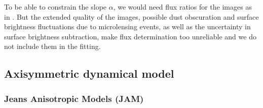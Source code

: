 \documentclass[useAMS,usenatbib]{mnras}
\begin{document}
To be able to constrain the slope $\alpha$, we would need flux ratios for the images as in \citet{GlennEC}. But the extended quality of the images, possible dust obscuration and surface brightness fluctuations due to microlensing events, as well as the uncertainty in surface brightness subtraction, make flux determination too unreliable and we do not include them in the fitting.

\subsection{Axisymmetric dynamical model} \label{sec:model_JAM}

\subsubsection{Jeans Anisotropic Models (JAM)} 
\end{document}
